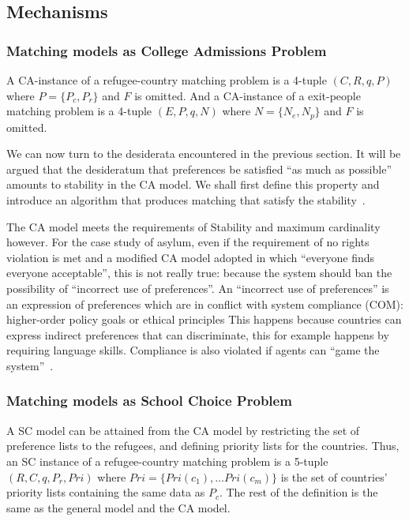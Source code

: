 \subsection{Mechanisms}\label{mechanisms}

\subsubsection{Matching models as College Admissions Problem}\label{matching-model-as-college-admissions-problem}
A CA-instance of a refugee-country matching problem is a 4-tuple \((C, R, q, P)\) where \(P = \{ P_c, P_r\}\) and \(F\) is omitted.
And a CA-instance of a exit-people matching problem is a 4-tuple \((E, P, q, N)\) where \(N = \{ N_e ,  N_p\}\) and \(F\) is omitted.

We can now turn to the desiderata encountered in the previous section.
It will be argued that the desideratum that preferences be satisfied “as much as possible” amounts to stability in the CA
model.
We shall first define this property and introduce an algorithm that produces matching that satisfy the stability~\cite{basshuysen}.

The CA model meets the requirements of Stability and maximum cardinality however.
For the case study of asylum, even if the requirement of no rights violation is met and a modified CA model adopted in which “everyone finds everyone acceptable”, this is not really true: because the system should ban the possibility of “incorrect use of preferences”.
An “incorrect use of preferences” is an expression of preferences which are in conflict with system compliance (COM): higher-order policy goals or ethical principles
This happens because countries can express indirect preferences that can discriminate, this for example happens by requiring language skills.
Compliance is also violated if agents can “game the system”~\cite{basshuysen}.

\subsubsection{Matching models as School Choice Problem}\label{matching-model-as-school-choice-problem}
A SC model can be attained from the CA model by restricting the set of preference lists to the refugees, and defining priority lists for the countries.
Thus, an SC instance of a refugee-country matching problem is a 5-tuple \((R, C, q, P_r, Pri)\) where \(Pri = \{Pri(c_1), \ldots Pri(c_m)\}\) is the set of countries’ priority lists containing the same data as \(P_c\).
The rest of the definition is the same as the general model and the CA model.

